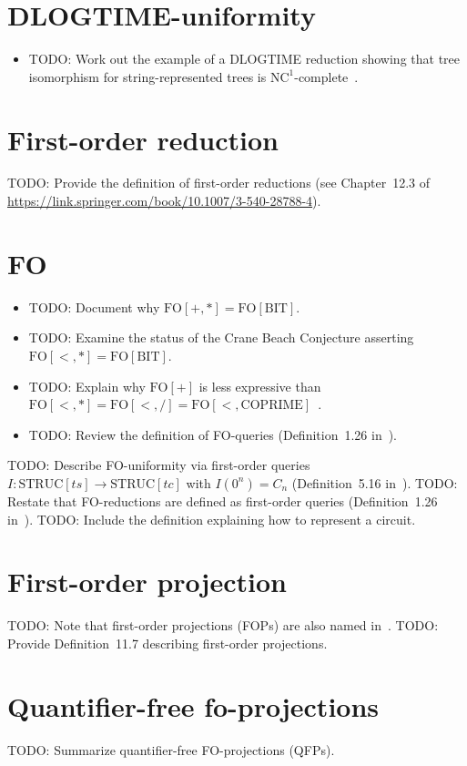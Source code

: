 \section{DLOGTIME-uniformity}
\begin{itemize}
\item TODO: Work out the example of a DLOGTIME reduction showing that tree isomorphism for string-represented trees is $\text{NC}^1$-complete~\cite{694595}.
\end{itemize}


\section{First-order reduction}
TODO: Provide the definition of first-order reductions (see Chapter~12.3 of \url{https://link.springer.com/book/10.1007/3-540-28788-4}).

\section{FO}
\begin{itemize}
\item TODO: Document why $\text{FO}[+, *] = \text{FO}[\mathrm{BIT}]$.
\item TODO: Examine the status of the Crane Beach Conjecture asserting $\text{FO}[<, *] = \text{FO}[\mathrm{BIT}]$.
\item TODO: Explain why $\text{FO}[+]$ is less expressive than $\text{FO}[<, *] = \text{FO}[<, /] = \text{FO}[<, \mathrm{COPRIME}]$~\cite{10.1002/malq.200310041}.
\item TODO: Review the definition of FO-queries (Definition~1.26 in~\cite{Immerman1999-IMMDC}).
\end{itemize}
TODO: Describe FO-uniformity via first-order queries $I : \mathrm{STRUC}[ts] \rightarrow \mathrm{STRUC}[tc]$ with $I(0^n) = C_n$ (Definition~5.16 in~\cite{Immerman1999-IMMDC}).
TODO: Restate that FO-reductions are defined as first-order queries (Definition~1.26 in~\cite{Immerman1999-IMMDC}).
TODO: Include the definition explaining how to represent a circuit.

\section{First-order projection}
TODO: Note that first-order projections (FOPs) are also named in~\cite{Immerman1999-IMMDC}.
TODO: Provide Definition~11.7 describing first-order projections.
\section{Quantifier-free fo-projections}
TODO: Summarize quantifier-free FO-projections (QFPs).

